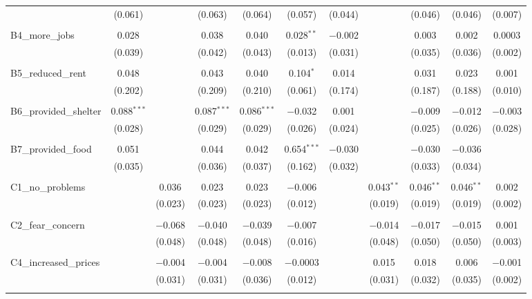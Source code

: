 \begin{table}[H]
\begin{tabular}{@{\extracolsep{4pt}}lcccccccccc}
  & (0.061) &  & (0.063) & (0.064) & (0.057) & (0.044) &  & (0.046) & (0.046) & (0.007) \\ 
  & & & & & & & & & & \\ 
 B4\_more\_jobs & 0.028 &  & 0.038 & 0.040 & 0.028$^{**}$ & $-$0.002 &  & 0.003 & 0.002 & 0.0003 \\ 
  & (0.039) &  & (0.042) & (0.043) & (0.013) & (0.031) &  & (0.035) & (0.036) & (0.002) \\ 
  & & & & & & & & & & \\ 
 B5\_reduced\_rent & 0.048 &  & 0.043 & 0.040 & 0.104$^{*}$ & 0.014 &  & 0.031 & 0.023 & 0.001 \\ 
  & (0.202) &  & (0.209) & (0.210) & (0.061) & (0.174) &  & (0.187) & (0.188) & (0.010) \\ 
  & & & & & & & & & & \\ 
 B6\_provided\_shelter & 0.088$^{***}$ &  & 0.087$^{***}$ & 0.086$^{***}$ & $-$0.032 & 0.001 &  & $-$0.009 & $-$0.012 & $-$0.003 \\ 
  & (0.028) &  & (0.029) & (0.029) & (0.026) & (0.024) &  & (0.025) & (0.026) & (0.028) \\ 
  & & & & & & & & & & \\ 
 B7\_provided\_food & 0.051 &  & 0.044 & 0.042 & 0.654$^{***}$ & $-$0.030 &  & $-$0.030 & $-$0.036 &  \\ 
  & (0.035) &  & (0.036) & (0.037) & (0.162) & (0.032) &  & (0.033) & (0.034) &  \\ 
  & & & & & & & & & & \\ 
 C1\_no\_problems &  & 0.036 & 0.023 & 0.023 & $-$0.006 &  & 0.043$^{**}$ & 0.046$^{**}$ & 0.046$^{**}$ & 0.002 \\ 
  &  & (0.023) & (0.023) & (0.023) & (0.012) &  & (0.019) & (0.019) & (0.019) & (0.002) \\ 
  & & & & & & & & & & \\ 
 C2\_fear\_concern &  & $-$0.068 & $-$0.040 & $-$0.039 & $-$0.007 &  & $-$0.014 & $-$0.017 & $-$0.015 & 0.001 \\ 
  &  & (0.048) & (0.048) & (0.048) & (0.016) &  & (0.048) & (0.050) & (0.050) & (0.003) \\ 
  & & & & & & & & & & \\ 
 C4\_increased\_prices &  & $-$0.004 & $-$0.004 & $-$0.008 & $-$0.0003 &  & 0.015 & 0.018 & 0.006 & $-$0.001 \\ 
  &  & (0.031) & (0.031) & (0.036) & (0.012) &  & (0.031) & (0.032) & (0.035) & (0.002) \\ 
  & & & & & & & & & & \\ 

\end{tabular}
\end{table}
